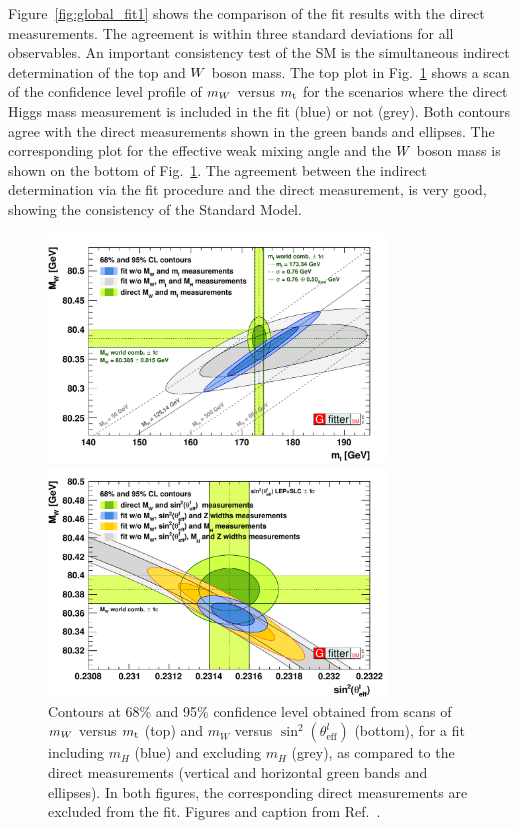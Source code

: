 Figure~\ref{fig:global_fit1} shows the comparison of the fit results with the direct measurements.
The agreement is within three standard deviations for all observables. 
An important consistency test of the SM is the simultaneous indirect determination of
the top and $W$ boson mass. The top plot in Fig.~\ref{fig:global_fit} shows a scan of the
confidence level profile of $m_{W}$ versus $m_{\mathrm{t}}$ for the scenarios where the direct Higgs mass
measurement is included in the fit (blue) or not (grey). Both contours agree with the direct
measurements shown in the green bands and ellipses. The corresponding plot for the effective weak
mixing angle and the $W$ boson mass is shown on the bottom of Fig.~\ref{fig:global_fit}. 
The agreement between the indirect determination via the fit procedure and the direct measurement,
is very good, showing the consistency of the Standard Model. 


\begin{figure}[p]
  \centering
  \includegraphics[width=0.8\textwidth]{figures/standardmodel/2014_07_16_Scan2D_MWvsmt_logo}
  
  \vspace{1eM}
  
  \includegraphics[width=0.8\textwidth]{figures/standardmodel/2014_07_16_Scan2D_MWvsSinEffLep_logo}
\caption{Contours at 68\% and 95\% confidence level obtained from scans of $m_{W}$ versus $m_{\mathrm{t}}$
(top) and $m_W$ versus $\sin^2 (\theta^l_{\text{eff}})$ (bottom), for a fit including $m_H$ (blue)
and excluding $m_H$ (grey), as compared to the direct measurements (vertical and horizontal green
bands and ellipses). In both figures, the corresponding direct measurements are excluded
from the fit. Figures and caption from Ref.~\cite{Baak:2014ora}.
\label{fig:global_fit}}
\end{figure}


